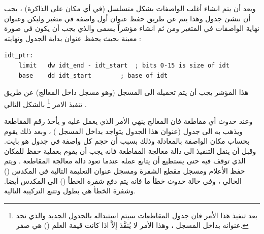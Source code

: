 \documentclass[document.tex]{subfiles}
\begin{document}
وبعد أن يتم انشاء أغلب الواصفات بشكل متسلسل (في أي مكان على الذاكرة) ، يجب أن ننشئ جدول  وهذا يتم عن طريق حفظ عنوان أول واصفة في متغير وليكن  وعنوان نهاية الواصفات في المتغير  ومن ثم انشاء مؤشراً يسمى  والذي يجب أن يكون في صورة معينة بحيث يحفظ عنوان بداية الجدول ونهايته :

\begin{english}

\lstset{numberstyle=\tiny,numbers=left,stepnumber=1,numbersep=5pt,tabsize=2,extendedchars=true,breaklines=true,frame=b,showspaces=false, showtabs=false,xleftmargin=10pt,framexleftmargin=10pt,framexrightmargin=5pt,framexbottommargin=4pt,showstringspaces=false,language=[x86masm]Assembler}


\begin{lstlisting}[label=idt_ptr,caption=\en{Value to put in IDTR}]
idt_ptr:
	limit	dw idt_end - idt_start	; bits 0-15 is size of idt
	base	dd idt_start		; base of idt
\end{lstlisting}
\end{english}

هذا المؤشر يجب أن يتم تحميله الى المسجل  (وهو مسجل داخل المعالج) عن طريق تنفيذ الامر \footnote{بعد تنفيذ هذا الأمر فان جدول المقاطعات سيتم استبداله بالجدول الجديد والذي نجد عنوانه بداخل المسجل  ، وهذا الأمر لا يُنفَّذ إلاَّ  اذا كانت قيمة العلم () هي صفر.} بالشكل التالي .

وعند حدوث أي مقاطعة فان المعالج ينهي الأمر الذي يعمل عليه و يأخذ رقم المقاطعة ويذهب به الى جدول  (عنوان هذا الجدول يتواجد بداخل المسجل ) ، وبعد ذلك يقوم بحساب مكان الواصفة بالمعادلة  وذلك بسبب أن حجم كل واصفة في جدول  هو  بايت. وقبل أن ينقل التنفيذ الى دالة معالجة المقاطعة فانه يجب أن يقوم بعملية حفظ للمكان الذي توقف فيه حتى يستطيع أن يتابع عمله عندما تعود دالة معالجة المقاطعة . ويتم حفظ الأعلام  ومسجل مقطع الشفرة  ومسجل عنوان التعليمة التالية  في المكدس ()  الحالي ، وفي حالة حدوث خطأ ما فانه يتم دفع شفرة الخطأ () الى المكدس أيضا. وشفرة الخطأ هي بطول  وتتبع التركيبة التالية.
\end{document}
